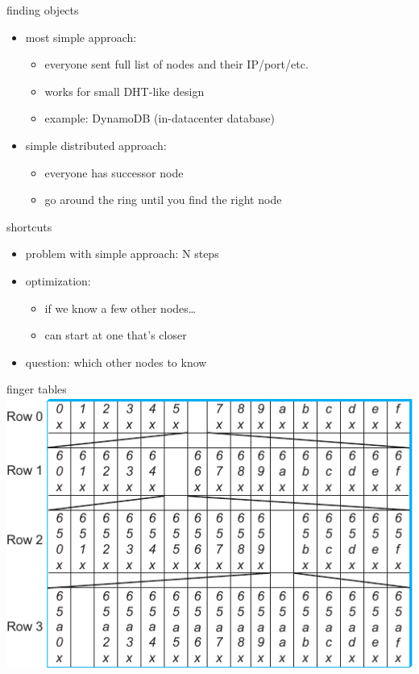 \begin{frame}{finding objects}
    \begin{itemize}
    \item most simple approach:
        \begin{itemize}
        \item everyone sent full list of nodes and their IP/port/etc.
        \item works for small DHT-like design
        \item example: DynamoDB (in-datacenter database)
        \end{itemize}
    \item simple distributed approach:
        \begin{itemize}
        \item everyone has successor node
        \item go around the ring until you find the right node
        \end{itemize}
    \end{itemize}
\end{frame}


\begin{frame}{shortcuts}
    \begin{itemize}
    \item problem with simple approach: N steps
    \item optimization:
        \begin{itemize}
        \item if we know a few other nodes\ldots
        \item can start at one that's closer
        \end{itemize}
    \item question: which other nodes to know
    \end{itemize}
\end{frame}

\begin{frame}{finger tables}
\includegraphics[width=\textwidth]{../p2p/sysapp-fig242}
\end{frame}

